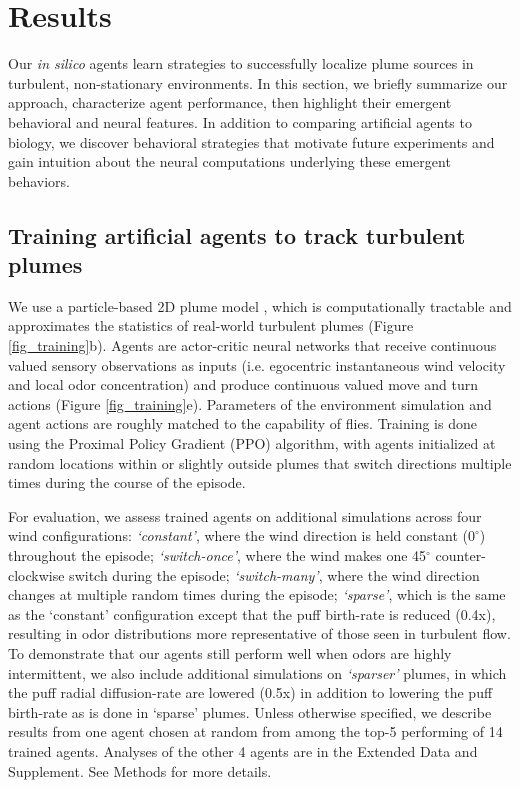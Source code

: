 \documentclass[5p,twocolumn,authoryear]{elsarticle}
\begin{document}
\section*{Results}
\label{sec_analysis}
Our \emph{in silico} agents learn strategies to successfully localize plume sources in turbulent, non-stationary environments.
In this section, we briefly summarize our approach, characterize agent performance, then highlight their emergent behavioral and neural features.
In addition to comparing artificial agents to biology, we discover behavioral strategies that motivate future experiments and gain intuition about the neural computations underlying these emergent behaviors.

\subsection*{Training artificial agents to track turbulent plumes}

We use a particle-based 2D plume model \citep{farrell2002filament}, which is computationally tractable and approximates the statistics of real-world turbulent plumes (Figure \ref{fig_training}b).
Agents are actor-critic neural networks \citep{konda2000actor} that receive continuous valued sensory observations as inputs (i.e. egocentric instantaneous wind velocity and local odor concentration) and produce continuous valued move and turn actions (Figure \ref{fig_training}e).
Parameters of the environment simulation and agent actions are roughly matched to the capability of flies.
Training is done using the Proximal Policy Gradient (PPO) \cite{schulman2017proximal} algorithm, with agents initialized at random locations within or slightly outside plumes that switch directions multiple times during the course of the episode.  

For evaluation, we assess trained agents on additional simulations across four wind configurations: 
\textit{`constant'}, where the wind direction is held constant ($0^{\circ}$) throughout the episode; 
\textit{`switch-once'}, where the wind makes one 45$^{\circ}$ counter-clockwise switch during the episode; 
\textit{`switch-many'}, where the wind direction changes at multiple random times during the episode; 
\textit{`sparse'}, which is the same as the `constant' configuration except that the puff birth-rate is reduced (0.4x), resulting in odor distributions more representative of those seen in turbulent flow.
To demonstrate that our agents still perform well when odors are highly intermittent, we also include additional simulations on \textit{`sparser'} plumes, in which the puff radial diffusion-rate are lowered (0.5x) in addition to lowering the puff birth-rate as is done in `sparse' plumes.
Unless otherwise specified, we describe results from one agent chosen at random from among the top-5 performing of 14 trained agents.
Analyses of the other 4 agents are in the Extended Data  and Supplement.
See Methods for more details.
\end{document}
